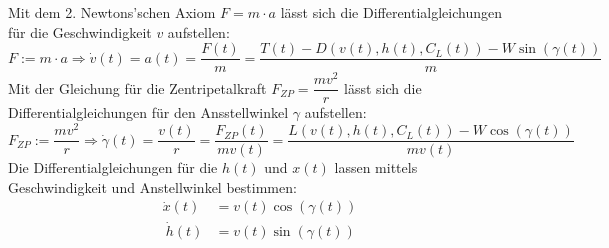 Mit dem 2. Newtons'schen Axiom $F = m \cdot a$ lässt sich die Differentialgleichungen für die Geschwindigkeit $v$ aufstellen:
\[F := m \cdot a \Rightarrow \dot{v}(t) = a(t) = \dfrac{F(t)}{m} = \dfrac{T(t) - D(v(t),h(t),C_L(t)) - W \sin(\gamma(t))}{m}\]
Mit der Gleichung für die Zentripetalkraft $F_{ZP} = \dfrac{m v^2}{r}$ lässt sich die Differentialgleichungen für den Ansstellwinkel $\gamma$ aufstellen:
\[F_{ZP} := \dfrac{m v^2}{r} \Rightarrow \dot{\gamma}(t) = \dfrac{v(t)}{r} = \dfrac{F_{ZP}(t)}{m v(t)} = \dfrac{L(v(t),h(t),C_L(t)) - W \cos(\gamma(t))}{m v(t)}\]
Die Differentialgleichungen für die $h(t)$ und $x(t)$ lassen mittels Geschwindigkeit und Anstellwinkel bestimmen:
\[\begin{split}
    \dot{x}(t) &= v(t) \cos(\gamma(t))\\\
    \dot{h}(t) &= v(t) \sin(\gamma(t))
\end{split} \]


